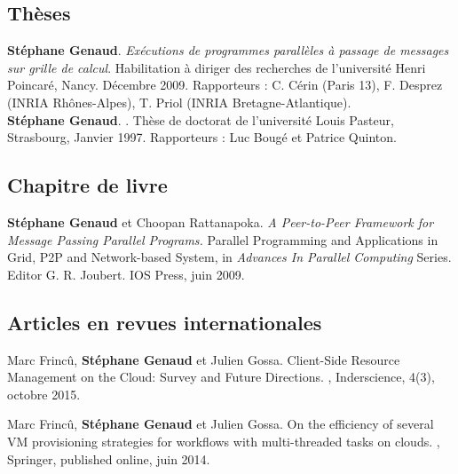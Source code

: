 \documentclass[11pt]{article}
\begin{document}
\small

\begin{thebibliography}{99}

\subsection*{Thèses}

\textbf{Stéphane Genaud}.
\newblock 
{\em Exécutions de programmes parallèles à passage de messages sur grille de 
calcul}.
\newblock 
Habilitation à diriger des recherches de l'université Henri Poincaré, 
Nancy. Décembre 2009.
\newblock 
Rapporteurs : C. Cérin (Paris 13), F. Desprez (INRIA Rhônes-Alpes), 
T. Priol (INRIA Bretagne-Atlantique).\\[2mm]

\textbf{Stéphane Genaud}.
.
\newblock Thèse de doctorat de l'université Louis Pasteur, Strasbourg, Janvier 1997.
\newblock Rapporteurs : Luc Bougé et Patrice Quinton. 

\subsection*{Chapitre de livre}

\textbf{Stéphane Genaud} et Choopan Rattanapoka.
\newblock 
\emph{A Peer-to-Peer Framework for Message Passing Parallel Programs.}
\newblock 
Parallel Programming and Applications in Grid, P2P and Network-based System,
in {\em Advances In Parallel Computing} Series. Editor G. R. Joubert.
IOS Press, juin 2009. 
 

\subsection*{Articles en revues internationales}

\setlength{\itemsep}{1.5mm}

\newblock Marc Frincû, \textbf{Stéphane Genaud} et Julien Gossa.
\newblock Client-Side Resource Management on the Cloud: Survey and Future Directions.
, Inderscience, 4(3), octobre 2015.


\newblock Marc Frincû, \textbf{Stéphane Genaud} et Julien Gossa.
\newblock On the efficiency of several VM provisioning strategies for workflows
with multi-threaded tasks on clouds.
, Springer, published online, juin 2014.


\end{thebibliography}
\end{document}
